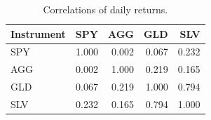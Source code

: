 \begin{table}[htbp]
\centering
\caption{Correlations of daily returns.}
\label{tab:correlations}
\begin{tabular}{lrrrr}
\toprule
Instrument & SPY & AGG & GLD & SLV \\
\midrule
SPY & 1.000 & 0.002 & 0.067 & 0.232 \\
AGG & 0.002 & 1.000 & 0.219 & 0.165 \\
GLD & 0.067 & 0.219 & 1.000 & 0.794 \\
SLV & 0.232 & 0.165 & 0.794 & 1.000 \\
\bottomrule
\end{tabular}
\end{table}
